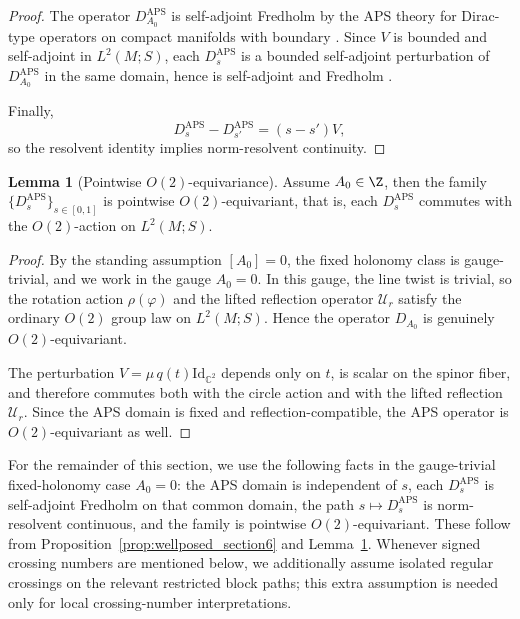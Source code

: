 \documentclass[11pt]{article}
\newcommand{\C}{\mathbb{C}}
\theoremstyle{definition}
\newtheorem{lemma}[theorem]{Lemma}
\DeclareMathOperator{\APS}{APS}
\numberwithin{equation}{section}
\newcommand{\Id}{\text{Id}}
\begin{document}
\begin{proof}
The operator \(D_{A_0}^{\APS}\) is self-adjoint Fredholm by the APS theory for Dirac-type
operators on compact manifolds with boundary \cite{APS1,BoossWojciechowski1993}. Since \(V\) is bounded and self-adjoint in
\(L^2(M;S)\), each \(D_s^{\APS}\) is a bounded self-adjoint perturbation of
\(D_{A_0}^{\APS}\) in the same domain, hence is self-adjoint and Fredholm \cite{Phillips1996,Waterstraat2017}.

Finally,
\begin{equation}\label{eq:linear_dependence_section6}
D_s^{\APS}-D_{s'}^{\APS}=(s-s')V,
\end{equation}
so the resolvent identity implies norm-resolvent continuity.
\end{proof}

\begin{lemma}[Pointwise \texorpdfstring{$O(2)$}{O(2)}-equivariance]
\label{lem:O2_equiv_family}
Assume $A_0 \in \Z$, then the family
\(\{D_s^{\APS}\}_{s\in[0,1]}\) is pointwise \(O(2)\)-equivariant, that is, each
\(D_s^{\APS}\) commutes with the \(O(2)\)-action on \(L^2(M;S)\).
\end{lemma}


\begin{proof}
By the standing assumption \([A_0]=0\), the fixed holonomy class is gauge-trivial, and we work in the gauge \(A_0=0\). In this gauge, the line twist is trivial, so the rotation action \(\rho(\varphi)\) and the lifted reflection operator \(\mathcal U_r\) satisfy the ordinary \(O(2)\) group law on \(L^2(M;S)\). Hence the operator \(D_{A_0}\) is genuinely \(O(2)\)-equivariant.

The perturbation \(V=\mu\,q(t)\Id_{\C^2}\) depends only on \(t\), is scalar on the spinor fiber, and therefore commutes both with the circle action and with the lifted reflection \(\mathcal U_r\). Since the APS domain is fixed and reflection-compatible, the APS operator is \(O(2)\)-equivariant as well.
\end{proof}


For the remainder of this section, we use the following facts in the gauge-trivial fixed-holonomy case \(A_0=0\): the APS domain is independent of \(s\), each \(D_s^{\APS}\) is self-adjoint Fredholm on that common domain, the path \(s\mapsto D_s^{\APS}\) is norm-resolvent continuous, and the family is pointwise \(O(2)\)-equivariant. These follow from Proposition~\ref{prop:wellposed_section6} and Lemma~\ref{lem:O2_equiv_family}. Whenever signed crossing numbers are mentioned below, we additionally assume isolated regular crossings on the relevant restricted block paths; this extra assumption is needed only for local crossing-number interpretations.
\end{document}
